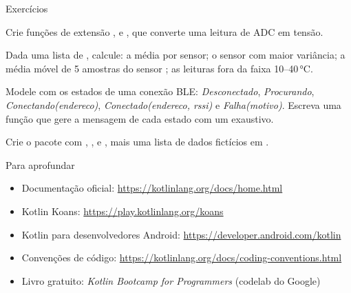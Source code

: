 \documentclass[aspectratio=169,10pt]{beamer}
\begin{document}
\begin{frame}{Exercícios}
  \begin{exercicio}
    Crie funções de extensão ,  e , que converte uma leitura de ADC em tensão.
  \end{exercicio}
  \begin{exercicio}
    Dada uma lista de , calcule: a média por sensor; o sensor com maior variância; a média móvel de 5 amostras do sensor ; as leituras fora da faixa 10--40\,°C.
  \end{exercicio}
  \begin{exercicio}
    Modele com  os estados de uma conexão BLE: \emph{Desconectado}, \emph{Procurando}, \emph{Conectando(endereco)}, \emph{Conectado(endereco, rssi)} e \emph{Falha(motivo)}. Escreva uma função que gere a mensagem de cada estado com um  exaustivo.
  \end{exercicio}
  \begin{projeto}
    Crie o pacote  com , ,  e , mais uma lista de dados fictícios em .
  \end{projeto}
\end{frame}

\begin{frame}{Para aprofundar}
  \small
  \begin{itemize}
    \item Documentação oficial: \url{https://kotlinlang.org/docs/home.html}
    \item Kotlin Koans: \url{https://play.kotlinlang.org/koans}
    \item Kotlin para desenvolvedores Android: \url{https://developer.android.com/kotlin}
    \item Convenções de código: \url{https://kotlinlang.org/docs/coding-conventions.html}
    \item Livro gratuito: \emph{Kotlin Bootcamp for Programmers} (codelab do Google)
  \end{itemize}
\end{frame}
\end{document}
